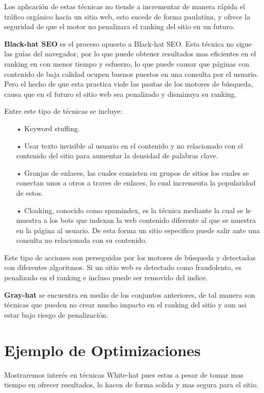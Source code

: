 \documentclass[12pt]{article}
\begin{document}
Los aplicación de estas técnicas no tiende a incrementar de manera rápida el tráfico orgánico hacia un sitio web, esto sucede de forma paulatina, y ofrece la seguridad de que el motor no penalizara el ranking del sitio en un futuro.

\textbf{Black-hat SEO} es el proceso opuesto a Black-hat SEO. Esta técnica no sigue las guías del navegador, por lo que puede obtener resultados mas eficientes en el ranking en con menor tiempo y esfuerzo, lo que puede causar que páginas con contenido de baja calidad ocupen buenos puestos en una consulta por el usuario. Pero el hecho de que esta practica viole las pautas de los motores de búsqueda, causa que en el futuro el sitio web sea penalizado y disminuya su ranking.

Entre este tipo de técnicas se incluye:

\begin{itemize}
    \item[•] Keyword stuffing.
    \item[•] Usar texto invisible al usuario en el contenido y no relacionado con el contenido del sitio para aumentar la densidad de palabras clave.
    \item[•] Granjas de enlaces, las cuales consisten en grupos de sitios los cuales se conectan unos a otros a traves de enlaces, lo cual incrementa la popularidad de estos.
    \item[•] Cloaking, conocido como spamindex, es la técnica mediante la cual se le muestra a los bots que indexan la web contenido diferente al que se muestra en la página al usuario. De esta forma un sitio especifico puede salir ante una consulta no relacionada con su contenido.
\end{itemize}

Este tipo de acciones son perseguidas por los motores de búsqueda y detectadas con diferentes algoritmos. Si un sitio web es detectado como fraudolento, es penalizado en el ranking e incluso puede ser removido del indice.

\textbf{Gray-hat} se encuentra en medio de los conjuntos anteriores, de tal manera son técnicas que pueden no crear mucho impacto en el ranking del sitio y aun asi estar bajo riesgo de penalización.

\section{Ejemplo de Optimizaciones}
Mostraremos interés en técnicas White-hat pues estas a pesar de tomar mas tiempo en ofrecer resultados, lo hacen de forma solida y mas segura para el sitio.
\end{document}
